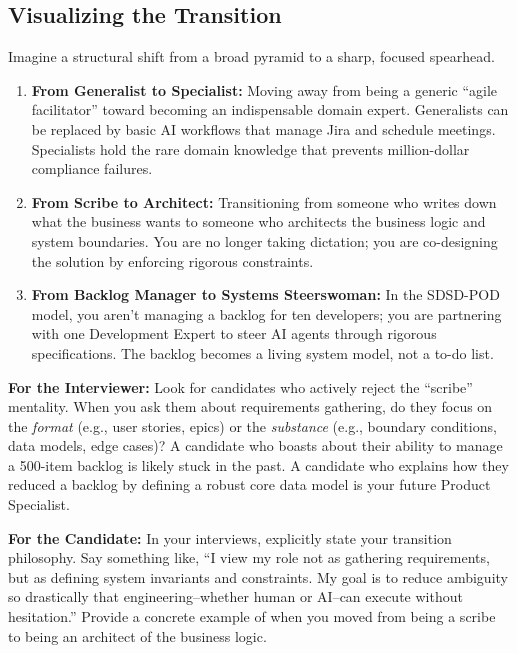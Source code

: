 \documentclass[
  11pt,
  openany,
  oneside]{book}
\providecommand{\tightlist}{%
  \setlength{\itemsep}{0pt}\setlength{\parskip}{0pt}}
\renewenvironment{quote}{\begin{customquote}}{\end{customquote}}
\begin{document}
\subsection{Visualizing the
Transition}\label{visualizing-the-transition}

Imagine a structural shift from a broad pyramid to a sharp, focused
spearhead.

\begin{enumerate}
\def\labelenumi{\arabic{enumi}.}
\tightlist
\item
  \textbf{From Generalist to Specialist:} Moving away from being a
  generic ``agile facilitator'' toward becoming an indispensable domain
  expert. Generalists can be replaced by basic AI workflows that manage
  Jira and schedule meetings. Specialists hold the rare domain knowledge
  that prevents million-dollar compliance failures.
\item
  \textbf{From Scribe to Architect:} Transitioning from someone who
  writes down what the business wants to someone who architects the
  business logic and system boundaries. You are no longer taking
  dictation; you are co-designing the solution by enforcing rigorous
  constraints.
\item
  \textbf{From Backlog Manager to Systems Steerswoman:} In the SDSD-POD
  model, you aren't managing a backlog for ten developers; you are
  partnering with one Development Expert to steer AI agents through
  rigorous specifications. The backlog becomes a living system model,
  not a to-do list.
\end{enumerate}

\begin{quote}
\textbf{For the Interviewer:} Look for candidates who actively reject
the ``scribe'' mentality. When you ask them about requirements
gathering, do they focus on the \emph{format} (e.g., user stories,
epics) or the \emph{substance} (e.g., boundary conditions, data models,
edge cases)? A candidate who boasts about their ability to manage a
500-item backlog is likely stuck in the past. A candidate who explains
how they reduced a backlog by defining a robust core data model is your
future Product Specialist.
\end{quote}

\begin{quote}
\textbf{For the Candidate:} In your interviews, explicitly state your
transition philosophy. Say something like, ``I view my role not as
gathering requirements, but as defining system invariants and
constraints. My goal is to reduce ambiguity so drastically that
engineering--whether human or AI--can execute without hesitation.''
Provide a concrete example of when you moved from being a scribe to
being an architect of the business logic.
\end{quote}
\end{document}
